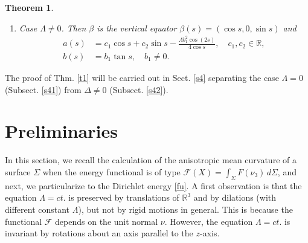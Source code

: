 \documentclass[12pt,a4paper,reqno]{amsart}
\def\r{\mathbb R}
\newtheorem{theorem}{Theorem}[section]
\begin{document}
\begin{theorem}
\begin{enumerate}
\begin{enumerate}
\end{enumerate}
\item Case $\Lambda\not=0$. Then $\beta$ is the vertical equator $\beta(s)=(\cos s,0,\sin s)$ and
\begin{equation}\label{sol4}
\begin{split}
a(s)&=c_1\cos s+c_2\sin s- \frac{\Lambda b_1^2\cos(2s)}{4\cos s},\quad c_1,c_2\in\r, \\
b(s)&= b_1\tan s,\quad b_1\not=0.
\end{split}
\end{equation} 
\end{enumerate}
\end{theorem}

 The proof of Thm. \ref{t1} will be carried out in Sect. \ref{s4} separating the case $\Lambda=0$ (Subsect. \ref{s41}) from $\Delta\not=0$ (Subsect. \ref{s42}). 


  

 


 

\section{Preliminaries}\label{s2}

In this section, we  recall the calculation of the anisotropic mean curvature of a surface $\Sigma$ when the energy functional is of type $\mathcal{F}(X)=\int_\Sigma F(\nu_3)\, d\Sigma$, and next, we particularize to the Dirichlet energy \eqref{fu}. A first observation is that the equation $\Lambda=ct.$ is preserved by translations of $\r^3$ and by dilations (with different constant $\Lambda$), but not by rigid motions in general. This is because the functional $\mathcal{F}$ depends on the unit normal $\nu$. However, the equation $\Lambda=ct.$  is invariant by rotations about an axis parallel to the $z$-axis.
\end{document}
